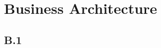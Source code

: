 \newpage\sloppy
\setlength{\RaggedRightRightskip}{0pt plus 2em}
\section{Business Architecture}

\subsection{B.1 }

\fussy
